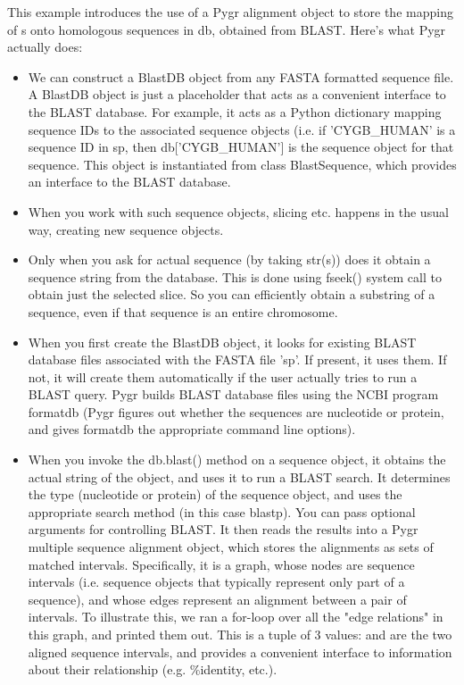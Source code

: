 \documentclass{howto}
\begin{document}
This example introduces the use of a Pygr alignment object to store the mapping of s onto homologous sequences in db, obtained from BLAST.  Here's what Pygr actually does:

\begin{itemize}

\item
We can construct a BlastDB object from any FASTA formatted sequence file.  A BlastDB object is just a placeholder that acts as a convenient interface to the BLAST database.  For example, it acts as a Python dictionary mapping sequence IDs to the associated sequence objects (i.e. if 'CYGB_HUMAN' is a sequence ID in sp, then db['CYGB_HUMAN'] is the sequence object for that sequence.  This object is instantiated from class BlastSequence, which provides an interface to the BLAST database.

\item 
When you work with such sequence objects, slicing etc. happens in the usual way, creating new sequence objects.

\item  
Only when you ask for actual sequence (by taking str(s)) does it obtain a sequence string from the database.  This is done using fseek() system call to obtain just the selected slice.  So you can efficiently obtain a substring of a sequence, even if that sequence is an entire chromosome.

\item
When you first create the BlastDB object, it looks for existing BLAST database files associated with the FASTA file 'sp'.  If present, it uses them.  If not, it will create them automatically if the user actually tries to run a BLAST query.  Pygr builds BLAST database files using the NCBI program formatdb (Pygr figures out whether the sequences are nucleotide or protein, and gives formatdb the appropriate command line options).  

\item 
When you invoke the db.blast() method on a sequence object, it obtains the actual string of the object, and uses it to run a BLAST search.  It determines the type (nucleotide or protein) of the sequence object, and uses the appropriate search method (in this case blastp).  You can pass optional arguments for controlling BLAST.  It then reads the results into a Pygr multiple sequence alignment object, which stores the alignments as sets of matched intervals.  Specifically, it is a graph, whose nodes are sequence intervals (i.e. sequence objects that typically represent only part of a sequence), and whose edges represent an alignment between a pair of intervals.  To illustrate this, we ran a for-loop over all the "edge relations" in this graph, and printed them out.  This is a tuple of 3 values:  and  are the two aligned sequence intervals, and  provides a convenient interface to information about their relationship (e.g. \%identity, etc.).  


\end{itemize}
\end{document}
